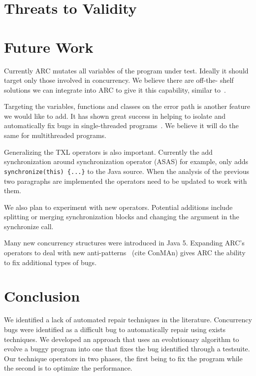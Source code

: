 \documentclass[10pt, conference, compsocconf]{IEEEtran}
\begin{document}
\section{Threats to Validity}




\section{Future Work}
\label{sec:future_work}

Currently ARC mutates all variables of the program under test. Ideally it
should target only those involved in concurrency. We believe there are off-the-
shelf solutions we can integrate into ARC to give it this capability, similar
to~\cite{CM08, HP00}.

Targeting the variables, functions and classes on the error path is another
feature we would like to add.  It has shown great success in helping to isolate
and automatically fix bugs in single-threaded programs~\cite{FNWG09, NWLF09,
WFGN10, GNFW11}. We believe it will do the same for multithreaded programs.

Generalizing the TXL operators is also important. Currently the add
synchronization around synchronization operator (ASAS) for example, only adds
\texttt{synchronize(this) \{...\}} to the Java source.  When the analysis of
the previous two paragraphs are implemented the operators need to be updated to
work with them.

We also plan to experiment with new operators.  Potential additions include
splitting or merging synchronization blocks and changing the argument in the
synchronize call.

Many new concurrency structures were introduced in Java 5. Expanding ARC's
operators to deal with new anti-patterns~\cite{BJ09} (cite ConMAn) gives ARC
the ability to fix additional types of bugs.

\section{Conclusion}
\label{sec:conclusion}

We identified a lack of automated repair techniques in the literature.
Concurrency bugs were identified as a difficult bug to automatically repair
using exists techniques. We developed an approach that uses an evolutionary
algorithm to evolve a buggy program into one that fixes the bug identified
through a testsuite. Our technique operators in two phases, the first being to
fix the program while the second is to optimize the performance.
\end{document}
